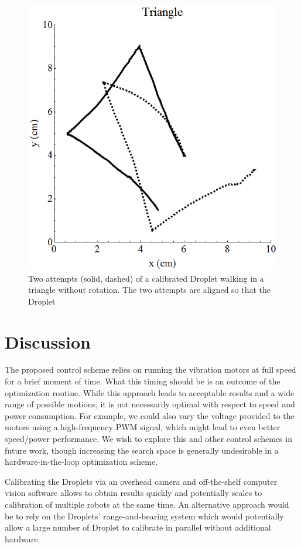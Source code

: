 \documentclass[letterpaper, 10pt, conference]{ieeeconf}
\begin{document}
\begin{figure}[!htb]
\centering
\includegraphics[width=0.9\linewidth]{Images/DropletWalksTriangle}
\caption{Two attempts (solid, dashed) of a calibrated Droplet walking in a triangle without rotation. The two attempts are aligned so that the Droplet}
\label{fig:triangleWalk}
\end{figure}

\section{Discussion}
The proposed control scheme relies on running the vibration motors at full speed for a brief moment of time. What this timing should be is an outcome of the optimization routine. While this approach leads to acceptable results and a wide range of possible motions, it is not necessarily optimal with respect to speed and power consumption. For example, we could also vary the voltage provided to the motors using a high-frequency PWM signal, which might lead to even better speed/power performance. We wish to explore this and other control schemes in future work, though increasing the search space is generally undesirable in a hardware-in-the-loop optimization scheme.  

Calibrating the Droplets via an overhead camera and off-the-shelf computer vision software allows to obtain results quickly and potentially scales to calibration of multiple robots at the same time. An alternative approach would be to rely on the Droplets' range-and-bearing system \cite{farrow14} which would potentially allow a large number of Droplet to calibrate in parallel without additional hardware.
\end{document}
